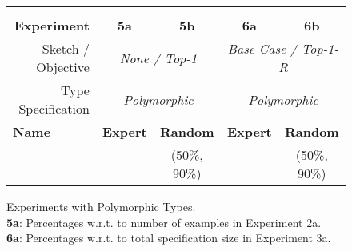 \begin{figure}[h]

\experimentTableSize

\begin{tabular}{l|cc|cc}
& \multicolumn{4}{c}{\textbf{\snsMyth{}}}
\\\hline
\multicolumn{1}{r|}{\textbf{Experiment}} &
\textbf{5a} & \textbf{5b} & \textbf{6a} & \textbf{6b}
\\\hline
\multicolumn{1}{r|}{{Sketch / Objective}} &
\multicolumn{2}{c|}{\textit{None / Top-1}} &
\multicolumn{2}{c}{\textit{Base Case / Top-1-R}}
\\\hline
\multicolumn{1}{r|}{Type Specification{}} &
\multicolumn{2}{c|}{\textit{Polymorphic}} &
\multicolumn{2}{c}{\textit{Polymorphic}}
\\\hline
\textbf{Name} &
\textbf{Expert} & \textbf{Random} &
\textbf{Expert} & \textbf{Random}
\\
&
& {(50\%, 90\%)} &
& {(50\%, 90\%)}
\\

\end{tabular}

\vsepBeforeCaption
  \captionsetup{justification=centering}
  \caption{
    Experiments with Polymorphic Types.
    \\
    \textbf{5a}:
      Percentages w.r.t. to number of examples in Experiment 2a.
    \\
    \textbf{6a}:
      Percentages w.r.t. to total specification size in Experiment 3a.
  }
\label{fig:poly-experiments}
\end{figure}
